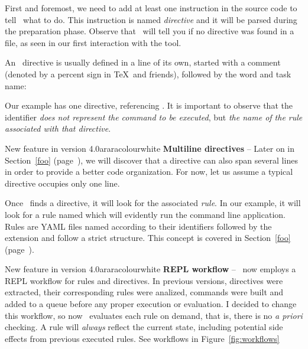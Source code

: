 First and foremost, we need to add at least one instruction in the source code to tell \arara\ what to do. This instruction is named \emph{directive} and it will be parsed during the preparation phase. Observe that \arara\ will tell you if no directive was found in a file, as seen in our first interaction with the tool.

An \arara\ directive is usually defined in a line of its own, started with a comment (denoted by a percent sign in \TeX\ and friends), followed by the word  and task name:


Our example has one directive, referencing . It is important to observe that the  identifier \emph{does not represent the command to be executed}, but \emph{the name of the rule associated with that directive}.

\begin{messagebox}{New feature in version 4.0}{araracolour}{\icinfo}{white}
\textbf{Multiline directives} -- Later on in Section~\ref{foo} (page~\pageref{foo}), we will discover that a directive can also span several lines in order to provide a better code organization. For now, let us assume a typical directive occupies only one line.
\end{messagebox}

Once \arara\ finds a directive, it will look for the associated \emph{rule}. In our example, it will look for a rule named  which will evidently run the  command line application. Rules are YAML files named according to their identifiers followed by the  extension and follow a strict structure. This concept is covered in Section~\ref{foo} (page~\pageref{foo}).

\begin{messagebox}{New feature in version 4.0}{araracolour}{\icattention}{white}
\textbf{REPL workflow} -- \arara\ now employs a REPL workflow for rules and directives. In previous versions, directives were extracted, their corresponding rules were analized, commands were built and added to a queue before any proper execution or evaluation. I decided to change this workflow, so now \arara\ evaluates each rule on demand, that is, there is no \emph{a priori} checking. A rule will \emph{always} reflect the current state, including potential side effects from previous executed rules. See workflows in Figure~\ref{fig:workflows}
\end{messagebox}

